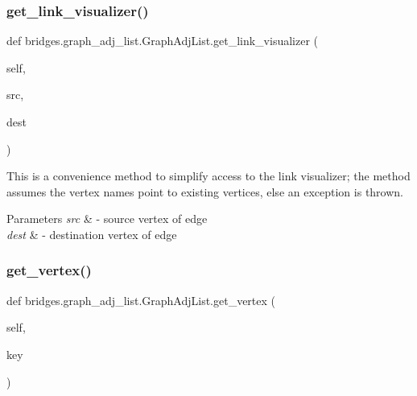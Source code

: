 \mbox{\label{classbridges_1_1graph__adj__list_1_1_graph_adj_list_abaa3015ae78e0f5ebc6fd2d2d2772927}} 
\subsubsection{\texorpdfstring{get\+\_\+link\+\_\+visualizer()}{get\_link\_visualizer()}}
{\footnotesize\ttfamily def bridges.\+graph\+\_\+adj\+\_\+list.\+Graph\+Adj\+List.\+get\+\_\+link\+\_\+visualizer (\begin{DoxyParamCaption}\item[{}]{self,  }\item[{}]{src,  }\item[{}]{dest }\end{DoxyParamCaption})}



This is a convenience method to simplify access to the link visualizer; the method assumes the vertex names point to existing vertices, else an exception is thrown. 


\begin{DoxyParams}{Parameters}
{\em src} & -\/ source vertex of edge \\
\hline
{\em dest} & -\/ destination vertex of edge \\
\hline
\end{DoxyParams}
\mbox{\label{classbridges_1_1graph__adj__list_1_1_graph_adj_list_af484d881d91177e723faf8b8a5c427e2}} 
\subsubsection{\texorpdfstring{get\+\_\+vertex()}{get\_vertex()}}
{\footnotesize\ttfamily def bridges.\+graph\+\_\+adj\+\_\+list.\+Graph\+Adj\+List.\+get\+\_\+vertex (\begin{DoxyParamCaption}\item[{}]{self,  }\item[{}]{key }\end{DoxyParamCaption})}

